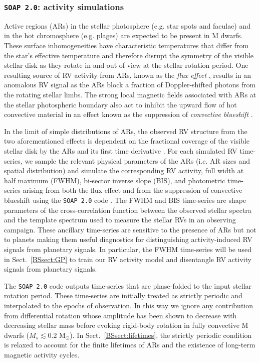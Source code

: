 \subsubsection{\texttt{SOAP 2.0}: activity simulations} \label{BSsect:soap}
Active regions (ARs) in the stellar photosphere (e.g. star spots and faculae) and in
the hot chromosphere (e.g. plages) are expected to be present in M dwarfs. These surface inhomogeneities
have characteristic temperatures that differ from the star's effective temperature and therefore 
disrupt the symmetry of the visible stellar disk as they rotate in and out of view at the stellar rotation
period. One resulting source of RV activity from ARs, known as the \emph{flux effect} \citep{dumusque14},
results in an anomalous RV signal as the ARs block a fraction of Doppler-shifted
photons from the rotating stellar limbs. The strong local magnetic fields associated with ARs
at the stellar photospheric boundary also act to inhibit the upward flow of hot convective material
in an effect known as the suppression of \emph{convective blueshift} \citep{dravins81}.

In the limit of simple distributions of ARs, the observed RV structure from the two aforementioned effects 
is dependent on the fractional coverage of the visible stellar disk by the ARs and its first time
derivative \citep{aigrain12}. For each simulated RV time-series, we sample the relevant physical
parameters of the ARs (i.e. AR sizes and spatial distribution) and 
simulate the corresponding RV activity, full width at half maximum (FWHM), bi-sector inverse slope (BIS),
and photometric time-series arising from both the flux effect and from the suppression of convective blueshift 
using the \texttt{SOAP 2.0} code \citep{dumusque14}. The FWHM and BIS time-series are shape parameters of
the cross-correlation function between the observed stellar spectra and the template spectrum used to measure
the stellar RVs in an observing campaign. These ancillary time-series are sensitive to the presence of ARs but not to planets
making them useful diagnostics for distinguishing activity-induced RV signals from planetary signals.
In particular, the FWHM time-series will be used in
Sect.~\ref{BSsect:GP} to train our RV activity model and disentangle RV activity signals from planetary signals.

The \texttt{SOAP 2.0} code outputs time-series that are phase-folded to the input 
stellar rotation period. These time-series are initially treated as strictly periodic
and interpolated to the epochs of observation. In
this way we ignore any contribution from differential rotation whose amplitude has been shown to
decrease with decreasing stellar mass \citep{donati08, morin08, kitchatinov11}
before evoking rigid-body rotation in fully convective M dwarfs
($M_s \lesssim 0.2$ M$_{\odot}$). In Sect.~\ref{BSsect:lifetimes},
the strictly periodic condition is relaxed to account for the finite lifetimes of ARs and the existence of
long-term magnetic activity cycles.

